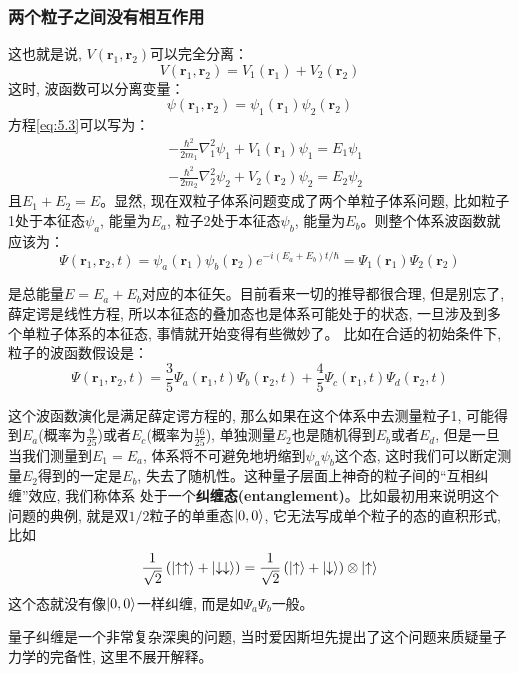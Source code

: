 \documentclass[a4paper,zihao=-4,linespread=1]{ctexrep}
\begin{document}
    \subsubsection*{两个粒子之间没有相互作用}
    这也就是说, $V(\mathbf{r}_1,\mathbf{r}_2)$可以完全分离：
    \[V(\mathbf{r}_1,\mathbf{r}_2)=V_1(\mathbf{r}_1)+V_2(\mathbf{r}_2)\]
    这时, 波函数可以分离变量：
    \[\psi(\mathbf{r}_1,\mathbf{r}_2)=\psi_1(\mathbf{r}_1)\psi_2(\mathbf{r}_2)\]
    方程\ref{eq:5.3}可以写为：
    \begin{align*}
        &-\frac{\hbar^2}{2m_1}\nabla_1^2\psi_1+V_1(\mathbf{r}_1)\psi_1=E_1\psi_1\\
        &-\frac{\hbar^2}{2m_2}\nabla_2^2\psi_2+V_2(\mathbf{r}_2)\psi_2=E_2\psi_2
    \end{align*}
    且$E_1+E_2=E$。显然, 现在双粒子体系问题变成了两个单粒子体系问题, 比如粒子1处于本征态$\psi_a$, 能量为$E_a$, 粒子2处于本征态$\psi_b$, 能量为$E_b$。则整个体系波函数就应该为：
    \[\Psi\left(\mathbf{r}_{1}, \mathbf{r}_{2}, t\right)=\psi_{a}\left(\mathbf{r}_{1}\right) \psi_{b}\left(\mathbf{r}_{2}\right) e^{-i\left(E_{a}+E_{b}\right) t / \hbar}
    =\Psi_1(\mathbf{r}_{1})\Psi_2(\mathbf{r}_{2})\]
    
    是总能量$E=E_a+E_b$对应的本征矢。目前看来一切的推导都很合理, 但是别忘了, 薛定谔是线性方程, 所以本征态的叠加态也是体系可能处于的状态, 一旦涉及到多个单粒子体系的本征态, 事情就开始变得有些微妙了。
    比如在合适的初始条件下, 粒子的波函数假设是：
    \[\Psi\left(\mathbf{r}_{1}, \mathbf{r}_{2}, t\right)=\frac{3}{5} \Psi_{a}\left(\mathbf{r}_{1}, t\right) \Psi_{b}\left(\mathbf{r}_{2}, t\right)+\frac{4}{5} \Psi_{c}\left(\mathbf{r}_{1}, t\right) \Psi_{d}\left(\mathbf{r}_{2}, t\right)\]
    
    这个波函数演化是满足薛定谔方程的, 那么如果在这个体系中去测量粒子1, 可能得到$E_a$(概率为$\frac{9}{25}$)或者$E_c$(概率为$\frac{16}{25}$), 单独测量$E_2$也是随机得到$E_b$或者$E_d$, 但是一旦
    当我们测量到$E_1=E_a$, 体系将不可避免地坍缩到$\psi_a\psi_b$这个态, 这时我们可以断定测量$E_2$得到的一定是$E_b$, 失去了随机性。这种量子层面上神奇的粒子间的“互相纠缠”效应, 我们称体系
    处于一个\textbf{纠缠态(entanglement)}。比如最初用来说明这个问题的典例, 就是双$1/2$粒子的单重态$\ket{0,0}$, 它无法写成单个粒子的态的直积形式, 比如
    \[\frac{1}{\sqrt{2}}\left(\ket{\uparrow\uparrow}+\ket{\downarrow\downarrow}\right)=\frac{1}{\sqrt{2}}\left(\ket{\uparrow}+\ket{\downarrow}\right)\otimes\ket{\uparrow}\]
    这个态就没有像$\ket{0,0}$一样纠缠, 而是如$\Psi_a\Psi_b$一般。

    量子纠缠是一个非常复杂深奥的问题, 当时爱因斯坦先提出了这个问题来质疑量子力学的完备性, 这里不展开解释。
\end{document}
